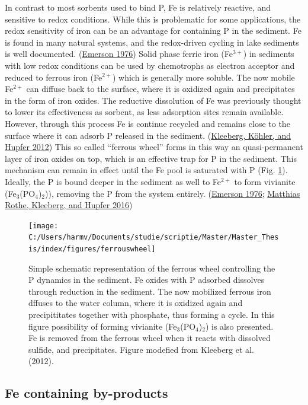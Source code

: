 \documentclass[a4paper,11pt]{article}
\begin{document}
In contrast to most sorbents used to bind P, Fe is relatively reactive, and sensitive to redox conditions. While this is problematic for some applications, the redox sensitivity of iron can be an advantage for containing P in the sediment. Fe is found in many natural systems, and the redox-driven cycling in lake sediments is well documented. (\protect\hyperlink{ref-emersonEarlyDiagenesisAnaerobic1976}{Emerson 1976}) Solid phase ferric iron (Fe\(^{3+}\)) in sediments with low redox conditions can be used by chemotrophs as electron acceptor and reduced to ferrous iron (Fe\(^{2+}\)) which is generally more soluble. The now mobile Fe\(^{2+}\) can diffuse back to the surface, where it is oxidized again and precipitates in the form of iron oxides. The reductive dissolution of Fe was previously thought to lower its effectiveness as sorbent, as less adsorption sites remain available. However, through this process Fe is continue recycled and remains close to the surface where it can adsorb P released in the sediment. (\protect\hyperlink{ref-kleebergHowEffectivelyDoes2012}{Kleeberg, Köhler, and Hupfer 2012}) This so called ``ferrous wheel'' forms in this way an quasi-permanent layer of iron oxides on top, which is an effective trap for P in the sediment. This mechanism can remain in effect until the Fe pool is saturated with P (Fig. \ref{fig:fwheel}). Ideally, the P is bound deeper in the sediment as well to Fe\(^{2+}\) to form vivianite (Fe\(_3\)(PO\(_4\))\(_2\))), removing the P from the system entirely. (\protect\hyperlink{ref-emersonEarlyDiagenesisAnaerobic1976}{Emerson 1976}; \protect\hyperlink{ref-rotheOccurrenceIdentificationEnvironmental2016}{Matthias Rothe, Kleeberg, and Hupfer 2016})
\begin{figure}

{\centering \texttt{[image: C:/Users/harmv/Documents/studie/scriptie/Master/Master\_Thesis/index/figures/ferrouswheel]} 

}

\caption{Simple schematic representation of the ferrous wheel controlling the P dynamics in the sediment. Fe oxides with P adsorbed dissolves through reduction in the sediment. The now mobilized ferrous iron dffuses to the water column, where it is oxidized again and precipititates together with phosphate, thus forming a cycle. In this figure possibility of forming vivianite (Fe$_3$(PO$_4$)$_2$) is also presented. Fe is removed from the ferrous wheel when it reacts with dissolved sulfide, and precipitates. Figure modefied from  Kleeberg et al. (2012).}\label{fig:fwheel}
\end{figure}
\hypertarget{fe-containing-by-products}{%
\subsection{Fe containing by-products}\label{fe-containing-by-products}}
\end{document}
